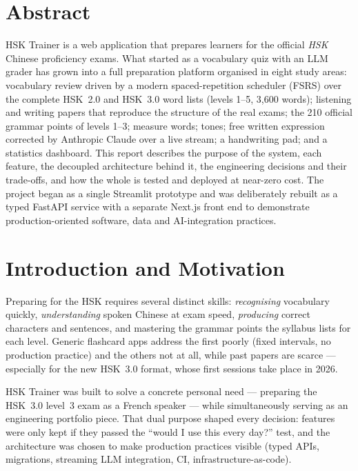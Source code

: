 \documentclass[11pt,a4paper]{article}
\begin{document}
\section*{\sffamily Abstract}
\noindent
HSK Trainer is a web application that prepares learners for the official
\emph{HSK} Chinese proficiency exams. What started as a vocabulary quiz with an
LLM grader has grown into a full preparation platform organised in eight study
areas: vocabulary review driven by a modern spaced-repetition scheduler (FSRS)
over the complete HSK~2.0 and HSK~3.0 word lists (levels 1--5, 3,600 words);
listening and writing papers that reproduce the structure of the real exams;
the 210 official grammar points of levels 1--3; measure words; tones; free
written expression corrected by Anthropic Claude over a live stream; a
handwriting pad; and a statistics dashboard. This report describes the purpose
of the system, each feature, the decoupled architecture behind it, the
engineering decisions and their trade-offs, and how the whole is tested and
deployed at near-zero cost. The project began as a single Streamlit prototype
and was deliberately rebuilt as a typed FastAPI service with a separate Next.js
front end to demonstrate production-oriented software, data and AI-integration
practices.

\vspace{0.8em}
{\footnotesize\tableofcontents}
\thispagestyle{fancy}
\newpage

\section{Introduction and Motivation}

Preparing for the HSK requires several distinct skills: \emph{recognising}
vocabulary quickly, \emph{understanding} spoken Chinese at exam speed,
\emph{producing} correct characters and sentences, and mastering the grammar
points the syllabus lists for each level. Generic flashcard apps address the
first poorly (fixed intervals, no production practice) and the others not at
all, while past papers are scarce --- especially for the new HSK~3.0 format,
whose first sessions take place in 2026.

HSK Trainer was built to solve a concrete personal need --- preparing the
HSK~3.0 level~3 exam as a French speaker --- while simultaneously serving as an
engineering portfolio piece. That dual purpose shaped every decision: features
were only kept if they passed the ``would I use this every day?'' test, and the
architecture was chosen to make production practices visible (typed APIs,
migrations, streaming LLM integration, CI, infrastructure-as-code).
\end{document}
